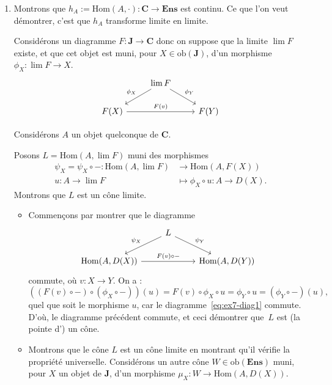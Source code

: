\documentclass{../../td}
\begin{document}
  \begin{enumerate}
    \item Montrons que $h_A := \mathrm{Hom}(A, \cdot): \mathbf{C} \to \mathbf{Ens}$ est continu.
      Ce que l'on veut démontrer, c'est que $h_A$ transforme limite en limite.

      Considérons un diagramme $F : \mathbf{J} \to \mathbf{C}$ donc on suppose que la limite $\lim F$ existe, et que cet objet est muni, pour $X \in \mathrm{ob}(\mathbf{J})$, d'un morphisme $\phi_X : \lim F \to X$.
      \begin{equation}
        \begin{tikzcd}
          & \lim F \arrow[swap]{dl}{\phi_X} \arrow{dr}{\phi_Y}\\
          F(X) \arrow{rr}{F(v)} && F(Y)
        \end{tikzcd}
        \label{eq:ex7-diag1}
      \end{equation}

      Considérons $A$ un objet quelconque de $\mathbf{C}$.

      Posons $L = \mathrm{Hom}(A, \lim F)$ muni des morphismes \begin{align*}
        \psi_X = \psi_X \circ -: \mathrm{Hom}(A, \lim F) &\longrightarrow \mathrm{Hom}(A, F(X)) \\
        u : A \to \lim F &\longmapsto \phi_X \circ u : A \to D(X)
      .\end{align*}
      Montrons que $L$ est un cône limite.
      \begin{itemize}
        \item Commençons par montrer que le diagramme \[
          \begin{tikzcd}
            & L \arrow[swap]{dl}{\psi_X} \arrow{dr}{\psi_Y}\\
            \mathrm{Hom}(A, D(X)) \arrow{rr}{F(v)\circ -} && \mathrm{Hom}(A, D(Y))
          \end{tikzcd}
          \] 
          commute, où $v : X \to Y$.
          On a :
          \[
            ((F(v)\circ -) \circ (\phi_X \circ -))(u) = 
            F(v)\circ \phi_X \circ u = \phi_Y \circ u = (\phi_Y \circ -)(u)
          ,\] quel que soit le morphisme $u$, car le diagramme~\ref{eq:ex7-diag1} commute.
          D'où, le diagramme précédent commute, et ceci démontrer que~$L$ est (la pointe d') un cône.
        \item Montrons que le cône $L$ est un cône limite en montrant qu'il vérifie la propriété universelle.
          Considérons un autre cône $W \in \mathrm{ob}(\mathbf{Ens})$ muni, pour $X$ un objet de $\mathbf{J}$, d'un morphisme $\mu_X : W \to \mathrm{Hom}(A, D(X))$.


\end{itemize}
\end{enumerate}
\end{document}
